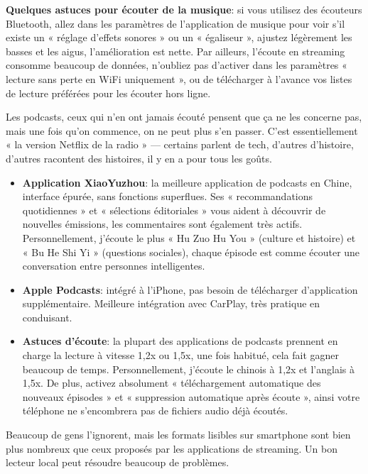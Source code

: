 \textbf{Quelques astuces pour écouter de la musique}: si vous utilisez des écouteurs Bluetooth, allez dans les paramètres de l'application de musique pour voir s'il existe un « réglage d'effets sonores » ou un « égaliseur », ajustez légèrement les basses et les aigus, l'amélioration est nette. Par ailleurs, l'écoute en streaming consomme beaucoup de données, n'oubliez pas d'activer dans les paramètres « lecture sans perte en WiFi uniquement », ou de télécharger à l'avance vos listes de lecture préférées pour les écouter hors ligne.


Les podcasts, ceux qui n'en ont jamais écouté pensent que ça ne les concerne pas, mais une fois qu'on commence, on ne peut plus s'en passer. C'est essentiellement « la version Netflix de la radio » — certains parlent de tech, d'autres d'histoire, d'autres racontent des histoires, il y en a pour tous les goûts.

\begin{itemize}
  \item \textbf{Application XiaoYuzhou}: la meilleure application de podcasts en Chine, interface épurée, sans fonctions superflues. Ses « recommandations quotidiennes » et « sélections éditoriales » vous aident à découvrir de nouvelles émissions, les commentaires sont également très actifs. Personnellement, j'écoute le plus « Hu Zuo Hu You » (culture et histoire) et « Bu He Shi Yi » (questions sociales), chaque épisode est comme écouter une conversation entre personnes intelligentes.
  \item \textbf{Apple Podcasts}: intégré à l'iPhone, pas besoin de télécharger d'application supplémentaire. Meilleure intégration avec CarPlay, très pratique en conduisant.
  \item \textbf{Astuces d'écoute}: la plupart des applications de podcasts prennent en charge la lecture à vitesse 1,2x ou 1,5x, une fois habitué, cela fait gagner beaucoup de temps. Personnellement, j'écoute le chinois à 1,2x et l'anglais à 1,5x. De plus, activez absolument « téléchargement automatique des nouveaux épisodes » et « suppression automatique après écoute », ainsi votre téléphone ne s'encombrera pas de fichiers audio déjà écoutés.
\end{itemize}


Beaucoup de gens l'ignorent, mais les formats lisibles sur smartphone sont bien plus nombreux que ceux proposés par les applications de streaming. Un bon lecteur local peut résoudre beaucoup de problèmes.

